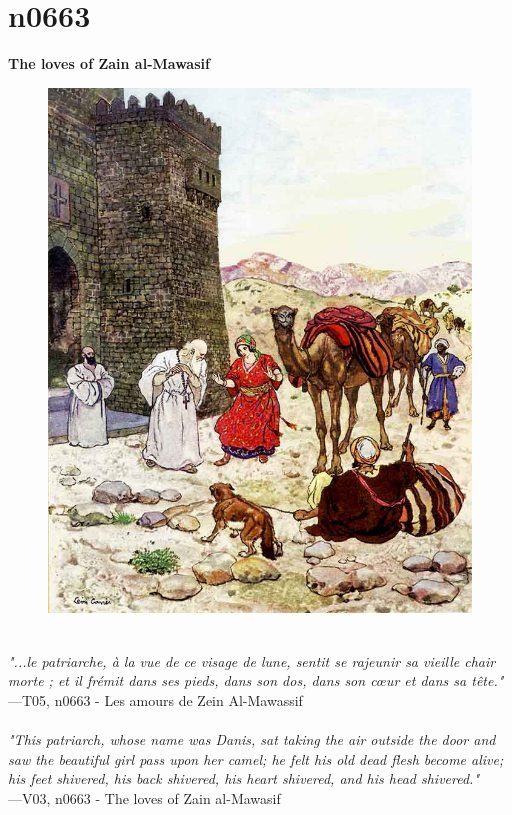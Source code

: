 \documentclass[../Carre_nights.tex]{subfiles}
\begin{document}
\newpage

\section{n0663}
\textbf{\Large{The loves of Zain al-Mawasif}} \\

\begin{figure}[ht]
\centering
\includegraphics[height=\figsize]{illustrations/volume_5/T05, n0663 - Les amours de Zein Al-Mawassif.jpg}
\end{figure}

\textit{\\
"...le patriarche, à la vue de ce visage de lune, sentit se rajeunir sa vieille chair morte ; et il frémit dans ses pieds, dans son dos, dans son cœur et dans sa tête."} \\
—T05, n0663 - Les amours de Zein Al-Mawassif \\~\\
\textit{"This patriarch, whose name was Danis, sat taking the air outside the door and saw the beautiful girl pass upon her camel; he felt his old dead flesh become alive; his feet shivered, his back shivered, his heart shivered, and his head shivered."} \\
—V03, n0663 - The loves of Zain al-Mawasif
\end{document}
